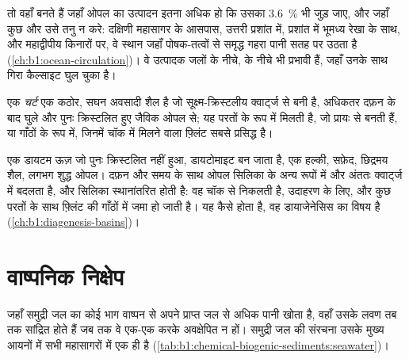तो  वहाँ बनते हैं जहाँ ओपल का उत्पादन इतना अधिक हो कि उसका \qty{3.6}{\%} भी जुड़ जाए, और जहाँ कुछ और उसे तनु न करे: दक्षिणी महासागर के आसपास, उत्तरी प्रशांत में, प्रशांत में भूमध्य रेखा के साथ, और महाद्वीपीय किनारों पर, वे स्थान जहाँ पोषक-तत्वों से समृद्ध गहरा पानी सतह पर उठता है (\cref{ch:b1:ocean-circulation})। वे उत्पादक जलों के नीचे,  के नीचे भी प्रभावी हैं, जहाँ उनके साथ गिरा कैल्साइट घुल चुका है।

\begin{definition}[चर्ट]\label{def:b1:chemical-biogenic-sediments:chert}
एक \emph{चर्ट} एक कठोर, सघन अवसादी शैल है जो सूक्ष्म-क्रिस्टलीय क्वार्ट्ज से बनी है, अधिकतर दफ़न के बाद घुले और पुनः क्रिस्टलित हुए जैविक ओपल से; यह परतों के रूप में मिलती है, जो प्रायः  से बनती हैं, या गाँठों के रूप में, जिनमें चॉक में मिलने वाला फ़्लिंट सबसे प्रसिद्ध है।
\end{definition}

एक डायटम ऊज़ जो पुनः क्रिस्टलित नहीं हुआ, डायटोमाइट बन जाता है, एक हल्की, सफ़ेद, छिद्रमय शैल, लगभग शुद्ध ओपल। दफ़न और समय के साथ ओपल सिलिका के अन्य रूपों में और अंततः क्वार्ट्ज में बदलता है, और सिलिका स्थानांतरित होती है: वह चॉक से निकलती है, उदाहरण के लिए, और कुछ परतों के साथ फ़्लिंट की गाँठों में जमा हो जाती है। यह कैसे होता है, वह डायाजेनेसिस का विषय है (\cref{ch:b1:diagenesis-basins})।

\section{वाष्पनिक निक्षेप}\label{sec:b1:chemical-biogenic-sediments:evaporites}

जहाँ समुद्री जल का कोई भाग वाष्पन से अपने प्राप्त जल से अधिक पानी खोता है, वहाँ उसके लवण तब तक सांद्रित होते हैं जब तक वे एक-एक करके अवक्षेपित न हों। समुद्री जल की संरचना उसके मुख्य आयनों में सभी महासागरों में एक ही है (\cref{tab:b1:chemical-biogenic-sediments:seawater})।

